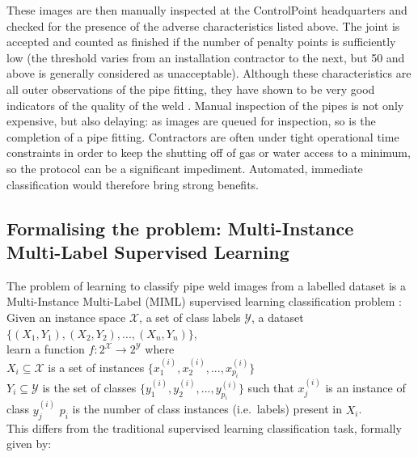 \documentclass[a4paper,11pt]{article}
\begin{document}
These images are then manually inspected at the ControlPoint headquarters and checked for the presence of the adverse characteristics listed above. The joint is accepted and counted as finished if the number of penalty points is sufficiently low (the threshold varies from an installation contractor to the next, but 50 and above is generally considered as unacceptable). Although these characteristics are all outer observations of the pipe fitting, they have shown to be very good indicators of the quality of the weld \cite{control-point}. Manual inspection of the pipes is not only expensive, but also delaying: as images are queued for inspection, so is the completion of a pipe fitting. Contractors are often under tight operational time constraints in order to keep the shutting off of gas or water access to a minimum, so the protocol can be a significant impediment. Automated, immediate classification would therefore bring strong benefits.

\subsection{Formalising the problem: Multi-Instance Multi-Label Supervised Learning}

The problem of learning to classify pipe weld images from a labelled dataset is a Multi-Instance Multi-Label (MIML) supervised learning classification problem \cite{MIML}: \\

\indent Given an instance space $\mathcal{X}$, a set of class labels $\mathcal{Y}$, a dataset $\{(X_{1},Y_{1}),(X_{2},Y_{2}), ..., (X_{n},Y_{n})\}$,\\ 
\indent learn a function $f : 2^{\mathcal{X}} \rightarrow 2^{\mathcal{Y}}$ where\\  
\indent \indent $X_{i} \subseteq \mathcal{X}$ is a set of instances $\{x_{1}^{(i)}, x_{2}^{(i)}, ..., x_{p_{i}}^{(i)}\}$\\   
\indent \indent $Y_{	i} \subseteq \mathcal{Y}$ is the set of classes $\{y_{1}^{(i)}, y_{2}^{(i)}, ..., y_{p_{i}}^{(i)}\}$ such that $x_{j}^{(i)}$ is an instance of class $y_{j}^{(i)}$ 
\indent \indent $p_{i}$ is the number of class instances (i.e.\ labels) present in $X_{i}$.\\


This differs from the traditional supervised learning classification task, formally given by: \\ 
\end{document}

